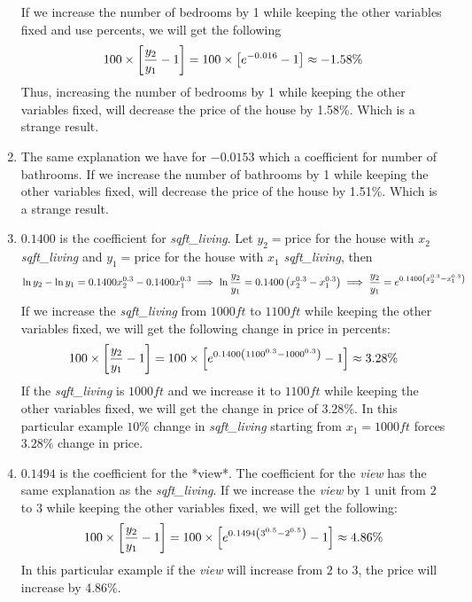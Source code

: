 \documentclass[10pt]{article}
\begin{document}
\begin{enumerate}
If we increase the number of bedrooms by 1 while keeping the other variables fixed and use percents, we will get the following
$$
\large
100 \times \left[\frac{y_2}{y_1} - 1 \right] = 100 \times \left[e^{-0.016} -1 \right] \approx -1.58\%
$$
Thus, increasing the number of bedrooms by 1 while keeping the other variables fixed, will decrease the price of the house by 1.58\%. Which is a strange result.
\item The same explanation we have for $-0.0153$ which a coefficient for number of bathrooms. If we increase the number of bathrooms by 1 while keeping the other variables fixed, will decrease the price of the house by 1.51\%. Which is a strange result.
 \item $0.1400$ is the coefficient for {\it sqft\_living}.
Let $y_2 = \text{price}$ for the house with $x_2$ {\it sqft\_living} and $y_1 = \text{price}$ for the house with $x_1$ {\it sqft\_living}, then 
$$
\large
\ln y_2 - \ln y_1 = 0.1400 x_2^{0.3} - 0.1400 x_1^{0.3} \implies \ln \frac{y_2}{y_1} = 0.1400 \left( x_2^{0.3} - x_1^{0.3}\right)\implies \frac{y_2}{y_1}=e^{0.1400 \left( x_2^{0.3} - x_1^{0.3}\right)}
$$
If we increase the {\it sqft\_living} from $1000ft$ to $1100ft$ while keeping the other variables fixed, we will get the following change in price in percents:
$$
\large
100 \times \left[\frac{y_2}{y_1} -1  \right] = 100 \times \left[ e^{0.1400 \left( 1100^{0.3} - 1000^{0.3}\right)} - 1 \right]\approx 3.28\%
$$
If the {\it sqft\_living} is $1000ft$ and we increase it to $1100ft$ while keeping the other variables fixed, we will get the change in price of $3.28\%$. In this particular example $10\%$ change in {\it sqft\_living} starting from $x_1 = 1000ft$ forces $3.28\%$ change in price.
\item  $0.1494$ is the coefficient for the *view*. The coefficient for the {\it view} has the same explanation as the {\it sqft\_living}. If we increase the {\it view} by $1$ unit from $2$ to $3$ while keeping the other variables fixed, we will get the following:
$$
\large 
100 \times \left[\frac{y_2}{y_1} -1  \right] = 100 \times \left[ e^{0.1494 \left( 3^{0.5} - 2^{0.5}\right)} - 1 \right]\approx 4.86\%
$$
In this particular example if the {\it view} will increase from $2$ to $3$, the price will increase by 4.86\%.


\end{enumerate}
\end{document}
